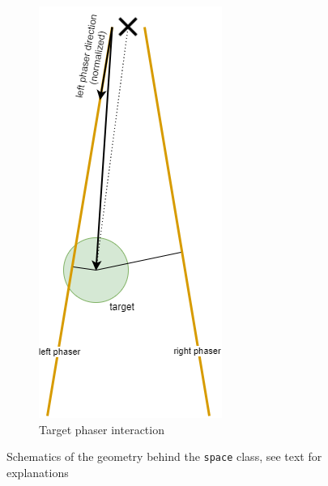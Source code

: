 \documentclass[hyperref, bachelorofscience]{cgvpub}
\begin{document}
\begin{figure}
\begin{subfigure}{.31\linewidth}
		\includegraphics[width=.85\linewidth]{../pics/phasers}
		\caption{Target phaser interaction}
		\label{fig:space:phaser}
	\end{subfigure}
	\caption{Schematics of the geometry behind the \lstinline|space| class, see text for explanations}
	\label{fig:space}
\end{figure}
\end{document}
